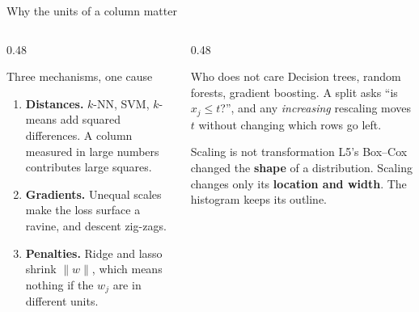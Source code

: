 \documentclass[aspectratio=169]{beamer}
\begin{document}
\begin{frame}[shrink=6]{Why the units of a column matter}
  \begin{columns}[T]
    \begin{column}{0.48\textwidth}
      \begin{block}{Three mechanisms, one cause}
        \begin{enumerate}\small
          \item \textbf{Distances.} $k$-NN, SVM, $k$-means add squared
            differences. A column measured in large numbers contributes
            large squares.
          \item \textbf{Gradients.} Unequal scales make the loss surface a
            ravine, and descent zig-zags.
          \item \textbf{Penalties.} Ridge and lasso shrink $\|w\|$, which
            means nothing if the $w_j$ are in different units.
        \end{enumerate}
      \end{block}
    \end{column}
    \begin{column}{0.48\textwidth}
      \begin{exampleblock}{Who does not care}
        \small Decision trees, random forests, gradient boosting. A split asks
        ``is $x_j \le t$?'', and any \emph{increasing} rescaling moves $t$
        without changing which rows go left.
      \end{exampleblock}
      \begin{alertblock}{Scaling is not transformation}
        \small L5's Box--Cox changed the \textbf{shape} of a distribution.
        Scaling changes only its \textbf{location and width}. The histogram
        keeps its outline.
      \end{alertblock}
    \end{column}
  \end{columns}
\end{frame}
\end{document}
